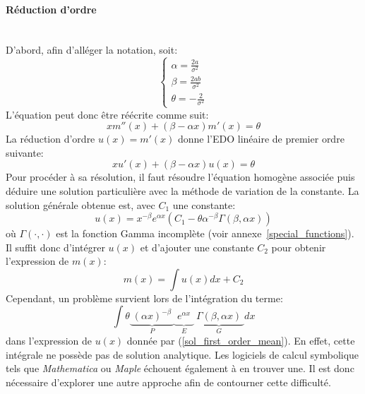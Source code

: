 \paragraph{Réduction d'ordre}\phantom{}\\
D'abord, afin d'alléger la notation, soit:
\begin{equation}\label{notation}
\begin{cases}
    \alpha = \frac{2a}{\sigma^2} \\
    \beta=\frac{2ab}{\sigma^2} \\
    \theta=-\frac{2}{\sigma^2}
\end{cases}
\end{equation}
L'équation peut donc être réécrite comme suit: 
\begin{equation}\label{simplified_ode_mean}
    xm''(x)+(\beta-\alpha x)m'(x)=\theta
\end{equation}
La réduction d'ordre $u(x)=m'(x)$ donne l'\acs{EDO} linéaire de premier ordre suivante:
\begin{equation}\label{order_reduction}
xu'(x)+(\beta-\alpha x)u(x)=\theta
\end{equation}
Pour procéder à sa résolution, il faut résoudre l'équation homogène associée puis déduire une solution particulière avec la méthode de variation de la constante. La solution générale obtenue est, avec $C_1$ une constante: 
\begin{equation}\label{sol_first_order_mean}
    u(x)=x^{-\beta}e^{\alpha x}(C_1-\theta \alpha^{-\beta}\Gamma(\beta, \alpha x))
\end{equation}
où $\Gamma(\cdot,\cdot)$ est la fonction Gamma incomplète (voir annexe~\ref{special_functions}).
Il suffit donc d'intégrer $u(x)$ et d'ajouter une constante $C_2$ pour obtenir l'expression de $m(x)$: 
\begin{equation}\label{intergration_sol_first_order}
    m(x)=\int u(x)dx+C_2
\end{equation}
Cependant, un problème survient lors de l'intégration du terme:
\begin{equation}\label{problematic_integral}
    \int\theta \underbrace{\phantom{|}{(\alpha x)}^{-\beta}\phantom{|}}_{P}\underbrace{\phantom{|}e^{\alpha x}\phantom{|}}_{E}\underbrace{\phantom{|}\Gamma(\beta, \alpha x)\phantom{|}}_{G}dx
\end{equation}
dans l'expression de $u(x)$ donnée par (\ref{sol_first_order_mean}). En effet, cette intégrale ne possède pas de solution analytique. Les logiciels de calcul symbolique tels que \textit{Mathematica} ou \textit{Maple} échouent également à en trouver une. Il est donc nécessaire d'explorer une autre approche afin de contourner cette difficulté.
